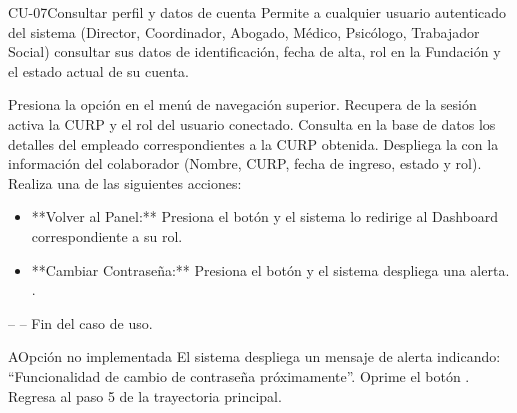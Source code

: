 \begin{UseCase}{CU-07}{Consultar perfil y datos de cuenta}{
	Permite a cualquier usuario autenticado del sistema (Director, Coordinador, Abogado, Médico, Psicólogo, Trabajador Social) consultar sus datos de identificación, fecha de alta, rol en la Fundación y el estado actual de su cuenta.
}
\end{UseCase}

\begin{UCtrayectoria}
	\UCpaso[\UCactor] Presiona la opción  en el menú de navegación superior.
	\UCpaso Recupera de la sesión activa la CURP y el rol del usuario conectado.
	\UCpaso Consulta en la base de datos los detalles del empleado correspondientes a la CURP obtenida.
	\UCpaso Despliega la  con la información del colaborador (Nombre, CURP, fecha de ingreso, estado y rol).
	\UCpaso[\UCactor] Realiza una de las siguientes acciones:
		\begin{itemize}
			\item **Volver al Panel:** Presiona el botón  y el sistema lo redirige al Dashboard correspondiente a su rol.
			\item **Cambiar Contraseña:** Presiona el botón  y el sistema despliega una alerta. .
		\end{itemize}
	\UCpaso[] -- -- Fin del caso de uso.
\end{UCtrayectoria}

\begin{UCtrayectoriaA}{A}{Opción no implementada}
	\UCpaso El sistema despliega un mensaje de alerta indicando: ``Funcionalidad de cambio de contraseña próximamente''.
	\UCpaso[\UCactor] Oprime el botón .
	\UCpaso Regresa al paso 5 de la trayectoria principal.
\end{UCtrayectoriaA}
